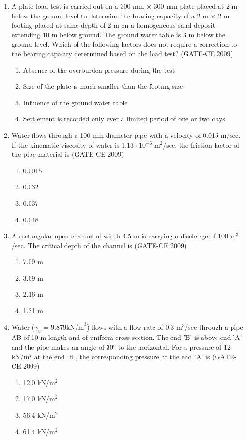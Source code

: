 \documentclass[12pt]{article}
\begin{document}
\begin{enumerate}[label=Q.\arabic*]
    \item A plate load test is carried out on a 300 mm $\times$ 300 mm plate placed at 2 m below the ground level to determine the bearing capacity of a 2 m $\times$ 2 m footing placed at same depth of 2 m on a homogeneous sand deposit extending 10 m below ground. The ground water table is 3 m below the ground level. Which of the following factors does not require a correction to the bearing capacity determined based on the load test? (GATE-CE 2009)
    \begin{enumerate}[label=(\Alph*)]
        \item Absence of the overburden pressure during the test
        \item Size of the plate is much smaller than the footing size
        \item Influence of the ground water table
        \item Settlement is recorded only over a limited period of one or two days
    \end{enumerate}
    
    \item Water flows through a 100 mm diameter pipe with a velocity of 0.015 m/sec. If the kinematic viscosity of water is 1.13$\times$10$^{-6}$ m$^2$/sec, the friction factor of the pipe material is (GATE-CE 2009)
    \begin{enumerate}[label=(\Alph*)]
        \item 0.0015 
        \item 0.032 
        \item 0.037 
        \item 0.048
    \end{enumerate}
    
    \item A rectangular open channel of width 4.5 m is carrying a discharge of 100 m$^3$/sec. The critical depth of the channel is (GATE-CE 2009)
    \begin{enumerate}[label=(\Alph*)]
        \item 7.09 m 
        \item 3.69 m 
        \item 2.16 m 
        \item 1.31 m
    \end{enumerate}
    
    \item Water ($\gamma_w = 9.879 \text{kN/m}^3$) flows with a flow rate of 0.3 m$^3$/sec through a pipe AB of 10 m length and of uniform cross section. The end 'B' is above end 'A' and the pipe makes an angle of 30° to the horizontal. For a pressure of 12 kN/m$^2$ at the end 'B', the corresponding pressure at the end 'A' is (GATE-CE 2009)
    \begin{enumerate}[label=(\Alph*)]
        \item 12.0 kN/m$^2$ 
        \item 17.0 kN/m$^2$ 
        \item 56.4 kN/m$^2$ 
        \item 61.4 kN/m$^2$
    \end{enumerate}
    

\end{enumerate}
\end{document}
